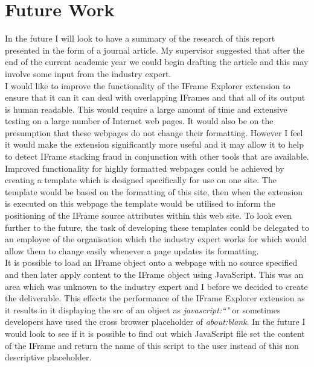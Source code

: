\documentclass[12pt]{article}
\begin{document}
\pagebreak

\section{Future Work} \label{futureWork}
In the future I will look to have a summary of the research of this report presented in the form of a journal article. My supervisor suggested that after the end of the current academic year we could begin drafting the article and this may involve some input from the industry expert. \\

I would like to improve the functionality of the IFrame Explorer extension to ensure that it can it can deal with overlapping IFrames and that all of its output is human readable. This would require a large amount of time and extensive testing on a large number of Internet web pages. It would also be on the presumption that these webpages do not change their formatting. However I feel it would make the extension significantly more useful and it may allow it to help to detect IFrame stacking fraud in conjunction with other tools that are available. Improved functionality for highly formatted webpages could be achieved by creating a template which is designed specifically for use on one site. The template would be based on the formatting of this site, then when the extension is executed on this webpage the template would be utilised to inform the positioning of the IFrame source attributes within this web site. To look even further to the future, the task of developing these templates could be delegated to an employee of the organisation which the industry expert works for which would allow them to change easily whenever a page updates its formatting. \\

It is possible to load an IFrame object onto a webpage with no source specified and then later apply content to the IFrame object using JavaScript. This was an area which was unknown to the industry expert and I before we decided to create the deliverable. This effects the performance of the IFrame Explorer extension as it results in it displaying the src of an object as \textit{javascript:``"} or sometimes developers have used the cross browser placeholder of \textit{about:blank}. In the future I would look to see if it is possible to find out which JavaScript file set the content of the IFrame and return the name of this script to the user instead of this non descriptive placeholder. \\
\end{document}
